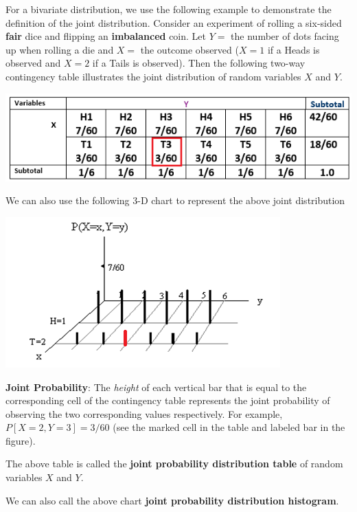 \documentclass[
]{book}
\begin{document}
For a bivariate distribution, we use the following example to demonstrate the definition of the joint distribution. Consider an experiment of rolling a six-sided \textbf{fair} dice and flipping an \textbf{imbalanced} coin. Let \(Y =\) the number of dots facing up when rolling a die and \(X =\) the outcome observed (\(X = 1\) if a Heads is observed and \(X = 2\) if a Tails is observed). Then the following two-way contingency table illustrates the joint distribution of random variables \(X\) and \(Y\).

\begin{center}\includegraphics[width=0.7\linewidth]{topic06/discreteBivariateJointDistTable} \end{center}

We can also use the following 3-D chart to represent the above joint distribution

\begin{center}\includegraphics[width=0.8\linewidth]{topic06/discreteBivariateDist} \end{center}

\textbf{Joint Probability}: The \emph{height} of each vertical bar that is equal to the corresponding cell of the contingency table represents the joint probability of observing the two corresponding values respectively. For example, \(P[X=2, Y =3] = 3/60\) (see the marked cell in the table and labeled bar in the figure).

The above table is called the \textbf{joint probability distribution table} of random variables \(X\) and \(Y\).

We can also call the above chart \textbf{joint probability distribution histogram}.
\end{document}
